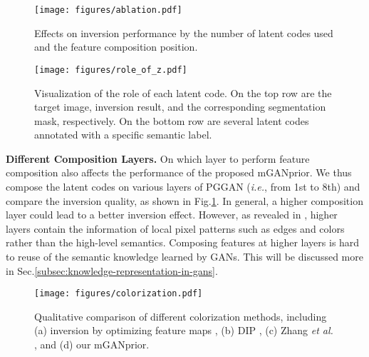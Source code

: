\documentclass[10pt,twocolumn,letterpaper]{article}
\begin{document}
\begin{figure}[t]
  \centering
  \texttt{[image: figures/ablation.pdf]}
  \vspace{-20pt}
  \captionsetup{font=small}
  \caption{
    Effects on inversion performance by the number of latent codes used and the feature composition position.
  }
  \label{fig:ablation}
  \vspace{-8pt}
\end{figure}


\begin{figure}[t]
  \centering
  \texttt{[image: figures/role\_of\_z.pdf]}
  \vspace{-20pt}
  \captionsetup{font=small}
  \caption{
    Visualization of the role of each latent code.
On the top row are the target image, inversion result, and the corresponding segmentation mask, respectively.
On the bottom row are several latent codes annotated with a specific semantic label.
  }
  \label{fig:role-of-z}
  \vspace{-15pt}
\end{figure}


\vspace{2pt}\noindent\textbf{Different Composition Layers.}
On which layer to perform feature composition also affects the performance of the proposed mGANprior.
We thus compose the latent codes on various layers of PGGAN (\emph{i.e.}, from 1st to 8th) and compare the inversion quality, as shown in Fig.\ref{fig:ablation}.
In general, a higher composition layer could lead to a better inversion effect.
However, as revealed in \cite{gandissection}, higher layers contain the information of local pixel patterns such as edges and colors rather than the high-level semantics.
Composing features at higher layers is hard to reuse of the semantic knowledge learned by GANs.
This will be discussed more in Sec.\ref{subsec:knowledge-representation-in-gans}.


\begin{figure*}[t]
  \centering
  \texttt{[image: figures/colorization.pdf]}
  \vspace{-20pt}
  \captionsetup{font=small}
  \caption{
    Qualitative comparison of different colorization methods, including (a) inversion by optimizing feature maps \cite{bau2019semantic}, (b) DIP \cite{ulyanov2018deep}, (c) Zhang \emph{et al.} \cite{zhang2016colorful}, and (d) our mGANprior.
  }
  \label{fig:colorization}
 \vspace{-15pt}
\end{figure*}
\end{document}
